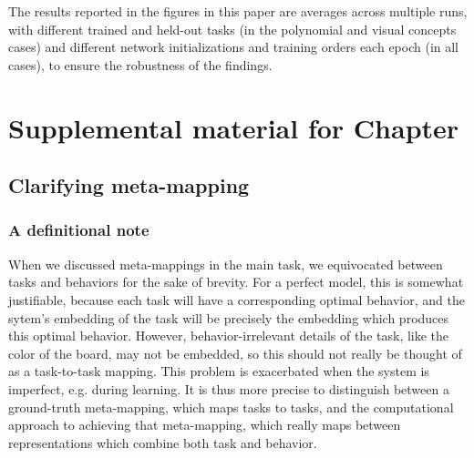 The results reported in the figures in this paper are averages across multiple runs, with different trained and held-out tasks (in the polynomial and visual concepts cases) and different network initializations and training orders each epoch (in all cases), to ensure the robustness of the findings. \par



\chapter{Supplemental material for Chapter } \label{appendix:zero_shot_via_homm}

\section{Clarifying meta-mapping} \label{app_clarifying_meta_mapping}
\subsection{A definitional note}
When we discussed meta-mappings in the main task, we equivocated between tasks and behaviors for the sake of brevity. For a perfect model, this is somewhat justifiable, because each task will have a corresponding optimal behavior, and the sytem's embedding of the task will be precisely the embedding which produces this optimal behavior. However, behavior-irrelevant details of the task, like the color of the board, may not be embedded, so this should not really be thought of as a task-to-task mapping. This problem is exacerbated when the system is imperfect, e.g. during learning. It is thus more precise to distinguish between a ground-truth meta-mapping, which maps tasks to tasks, and the computational approach to achieving that meta-mapping, which really maps between representations which combine both task and behavior. \par


